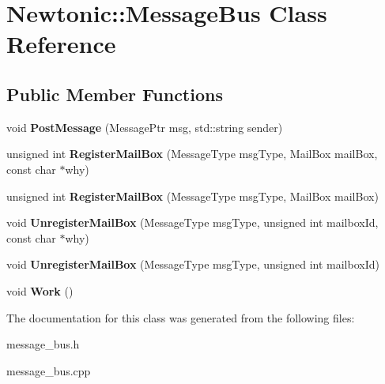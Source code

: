 \hypertarget{classNewtonic_1_1MessageBus}{}\section{Newtonic\+::Message\+Bus Class Reference}
\label{classNewtonic_1_1MessageBus}
\subsection*{Public Member Functions}
\begin{DoxyCompactItemize}
\item 
\mbox{\label{classNewtonic_1_1MessageBus_a40b0d7c30dcf79face5143691a956840}} 
void {\bfseries Post\+Message} (Message\+Ptr msg, std\+::string sender)
\item 
\mbox{\label{classNewtonic_1_1MessageBus_a7aac468c9f745f743f6b8d4f453f6e90}} 
unsigned int {\bfseries Register\+Mail\+Box} (Message\+Type msg\+Type, Mail\+Box mail\+Box, const char $\ast$why)
\item 
\mbox{\label{classNewtonic_1_1MessageBus_ae58937b36229a1713fcbd8d629d8326f}} 
unsigned int {\bfseries Register\+Mail\+Box} (Message\+Type msg\+Type, Mail\+Box mail\+Box)
\item 
\mbox{\label{classNewtonic_1_1MessageBus_a66283e79e5bb03cd447bd47b9a552d2f}} 
void {\bfseries Unregister\+Mail\+Box} (Message\+Type msg\+Type, unsigned int mailbox\+Id, const char $\ast$why)
\item 
\mbox{\label{classNewtonic_1_1MessageBus_a431ac6a20eb6bdce4c48110817035809}} 
void {\bfseries Unregister\+Mail\+Box} (Message\+Type msg\+Type, unsigned int mailbox\+Id)
\item 
\mbox{\label{classNewtonic_1_1MessageBus_ac69f7e0191104bea9a61ae1aa0b9ba3c}} 
void {\bfseries Work} ()
\end{DoxyCompactItemize}


The documentation for this class was generated from the following files\+:\begin{DoxyCompactItemize}
\item 
message\+\_\+bus.\+h\item 
message\+\_\+bus.\+cpp\end{DoxyCompactItemize}
